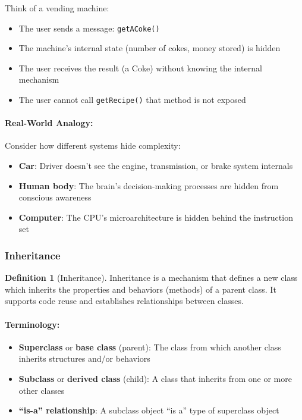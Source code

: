 \documentclass[11pt, a4paper, notitlepage]{report}
\theoremstyle{definition}
\newtheorem{definition}[theorem]{Definition}
\theoremstyle{remark}
\theoremstyle{definition}
\begin{document}
\begin{examtip}[title={Encapsulation in Practice}]
Think of a vending machine:
\begin{itemize}
  \item The user sends a message: \texttt{getACoke()}
  \item The machine's internal state (number of cokes, money stored) is hidden
  \item The user receives the result (a Coke) without knowing the internal mechanism
  \item The user cannot call \texttt{getRecipe()}  that method is not exposed
\end{itemize}
\end{examtip}

\paragraph{Real-World Analogy:}
Consider how different systems hide complexity:
\begin{itemize}
  \item \textbf{Car}: Driver doesn't see the engine, transmission, or brake system internals
  \item \textbf{Human body}: The brain's decision-making processes are hidden from conscious awareness
  \item \textbf{Computer}: The CPU's microarchitecture is hidden behind the instruction set
\end{itemize}

\subsubsection{Inheritance}

\begin{definition}[Inheritance]
\label{def:ch1-inheritance}
Inheritance is a mechanism that defines a new class which inherits the properties and behaviors (methods) of a parent class. It supports code reuse and establishes relationships between classes.
\end{definition}

\paragraph{Terminology:}
\begin{itemize}
  \item \textbf{Superclass} or \textbf{base class} (parent): The class from which another class inherits structures and/or behaviors
  \item \textbf{Subclass} or \textbf{derived class} (child): A class that inherits from one or more other classes
  \item \textbf{``is-a'' relationship}: A subclass object ``is a'' type of superclass object
\end{itemize}
\end{document}
